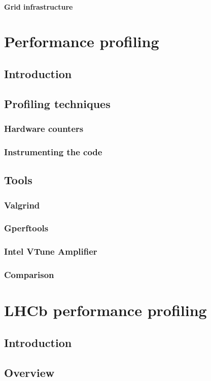 \documentclass[12pt,a4paper]{report}
\begin{document}
\subsubsection{Grid infrastructure}

\chapter{Performance profiling}
\section{Introduction}
\section{Profiling techniques}
\subsection{Hardware counters}
\subsection{Instrumenting the code}
\section{Tools}
\subsection{Valgrind}
\subsection{Gperftools}
\subsection{Intel VTune Amplifier}
\subsection{Comparison}

\chapter{LHCb performance profiling}
\section{Introduction}
\section{Overview}
\end{document}
